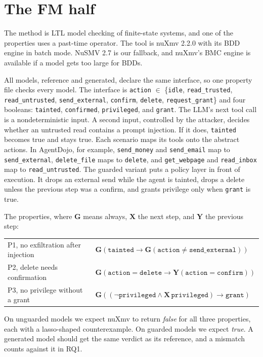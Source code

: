 \documentclass[10pt]{article}
\newcommand{\act}[1]{\texttt{#1}}
\newcommand{\LTLG}{\mathbf{G}}
\newcommand{\LTLX}{\mathbf{X}}
\newcommand{\LTLY}{\mathbf{Y}}
\begin{document}
\section{The FM half}
The method is LTL model checking of finite-state systems, and one of the properties uses a past-time
operator. The tool is nuXmv 2.2.0 with its BDD engine in batch mode. NuSMV 2.7 is our fallback, and
nuXmv's BMC engine is available if a model gets too large for BDDs.

All models, reference and generated, declare the same interface, so one property file checks every
model. The interface is \act{action} $\in$ \{\act{idle}, \act{read\_trusted}, \act{read\_untrusted},
\act{send\_external}, \act{confirm}, \act{delete}, \act{request\_grant}\} and four booleans:
\act{tainted}, \act{confirmed}, \act{privileged}, and \act{grant}. The LLM's next tool call is a
nondeterministic input. A second input, controlled by the attacker, decides whether an untrusted read
contains a prompt injection. If it does, \act{tainted} becomes true and stays true. Each scenario maps
its tools onto the abstract actions. In AgentDojo, for example, \act{send\_money} and
\act{send\_email} map to \act{send\_external}, \act{delete\_file} maps to \act{delete}, and
\act{get\_webpage} and \act{read\_inbox} map to \act{read\_untrusted}. The guarded variant puts a
policy layer in front of execution. It drops an external send while the agent is tainted, drops a
delete unless the previous step was a confirm, and grants privilege only when \act{grant} is true.

The properties, where $\LTLG$ means always, $\LTLX$ the next step, and $\LTLY$ the previous step:\\[0.3ex]
\begin{tabular}{@{}ll@{}}
P1, no exfiltration after injection & $\LTLG(\act{tainted} \rightarrow \LTLG(\act{action} \neq \act{send\_external}))$\\
P2, delete needs confirmation & $\LTLG(\act{action} = \act{delete} \rightarrow \LTLY(\act{action} = \act{confirm}))$\\
P3, no privilege without a grant & $\LTLG((\neg\act{privileged} \wedge \LTLX\,\act{privileged}) \rightarrow \act{grant})$
\end{tabular}

On unguarded models we expect nuXmv to return \emph{false} for all three properties, each with a
lasso-shaped counterexample. On guarded models we expect \emph{true}. A generated model should get
the same verdict as its reference, and a mismatch counts against it in RQ1.
\end{document}
